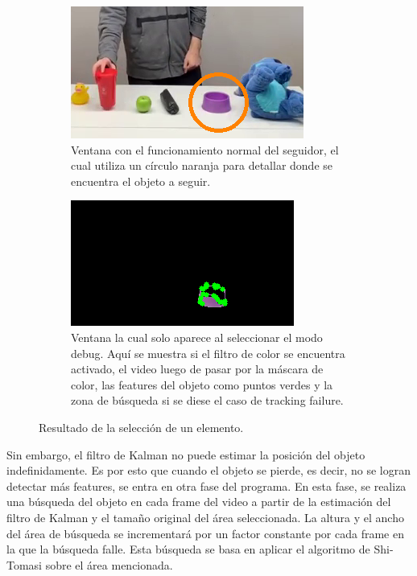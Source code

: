 \begin{figure}[]
\centering
	\begin{subfigure}{.4\textwidth}
		\centering
		\includegraphics[width=\textwidth]{Imagenes/Optical1.png}
		\caption{Ventana con el funcionamiento normal del seguidor, el cual utiliza un círculo naranja para detallar donde se encuentra el objeto a seguir.}
		\label{fig:optical1}
	\end{subfigure}
	\begin{subfigure}{.4\textwidth}
		\centering
		\includegraphics[width=\textwidth]{Imagenes/Optical2.png}
		\caption{Ventana la cual solo aparece al seleccionar el modo debug. Aquí se muestra si el filtro de color se encuentra activado, el video luego de pasar por la máscara de color, las features del objeto como puntos verdes y la zona de búsqueda si se diese el caso de tracking failure.}
		\label{fig:optical2}
	\end{subfigure}
	\caption{Resultado de la selección de un elemento.}
	\label{fig:optical12}
\end{figure}

Sin embargo, el filtro de Kalman no puede estimar la posición del objeto indefinidamente. Es por esto que cuando el objeto se pierde, es decir, no se logran detectar más features, se entra en otra fase del programa. En esta fase, se realiza una búsqueda del objeto en cada frame del video a partir de la estimación del filtro de Kalman y el tamaño original del área seleccionada. La altura y el ancho del área de búsqueda se incrementará por un factor constante por cada frame en la que la búsqueda falle. Esta búsqueda se basa en aplicar el algoritmo de Shi-Tomasi sobre el área mencionada.

